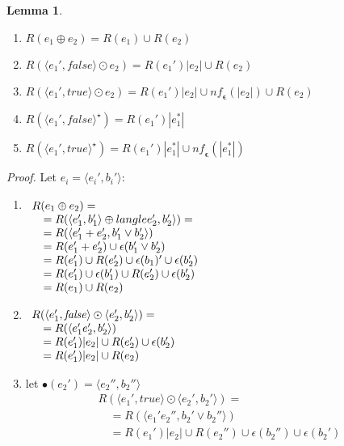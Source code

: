 \documentclass[preprint]{sigplanconf}
\newcommand{\false}{\mathit{false}}
\newcommand{\varoast}{\star}
\newcommand{\nf}{\mathit{nf}_{\!\mathbf{\epsilon}}}
\newcounter{item}
\newtheorem{lemma}[item]{Lemma}
\newenvironment{proof}{\begin{trivlist}\item[]{\em Proof.}}{\end{trivlist}}
\begin{document}
\begin{lemma}\ 
\begin{enumerate}
\item $R(e_1 \oplus e_2) = R(e_1) \cup R(e_2)$
\item $R(\langle e_1',\false \rangle \odot e_2) = R(e_1')|e_2| \cup R(e_2)$
\item $R(\langle e_1',true \rangle \odot e_2) = R(e_1')|e_2| \cup \nf(|e_2|) 
\cup R(e_2)$
\item $R(\langle e_1',\false \rangle^\varoast) = R(e_1')|e_1^*|$
\item $R(\langle e_1',true \rangle^\varoast) = R(e_1')|e_1^*| 
\cup \nf(|e_1^*|) $
\end{enumerate}
\end{lemma}
\begin{proof}
Let $e_i = \langle e_i',b_i' \rangle$: 
\begin{enumerate}
\item 
$
\begin{array}[t]{l}
R(e_1 \oplus e_2) = \\
\quad = R(\langle e_1',b_1' \rangle \oplus langle e_2',b_2' \rangle) =\\ 
\quad = R(\langle e_1'+e_2',b_1' \vee b_2' \rangle)\\
\quad = R(e_1'+e_2') \cup \epsilon(b_1' \vee b_2')\\
\quad = R(e_1') \cup R(e_2') \cup \epsilon(b_1)' \cup \epsilon(b_2')\\
\quad = R(e_1') \cup \epsilon(b_1') \cup R(e_2') \cup \epsilon(b_2')\\
\quad = R(e_1) \cup R(e_2)
\end{array}
$
\item 
$
\begin{array}[t]{l}
R(\langle e_1',\false \rangle \odot \langle e_2',b_2'\rangle) =\\
\quad = R(\langle e_1'e_2',b_2' \rangle)\\
\quad = R(e_1')|e_2| \cup R(e_2') \cup \epsilon(b_2')\\
\quad = R(e_1')|e_2| \cup R(e_2)
\end{array}
$
\item let $\bullet(e_2') = \langle e_2'',b_2''\rangle$
\[
\begin{array}{l}
R(\langle e_1',true \rangle \odot \langle e_2',b_2'\rangle) =\\
\quad = R(\langle e_1'e_2'',b_2' \vee b_2'' \rangle)\\
\quad = R(e_1')|e_2| \cup R(e_2'') \cup \epsilon(b_2'') \cup \epsilon(b_2')\\

\end{array}\]
\end{enumerate}
\end{proof}
\end{document}
